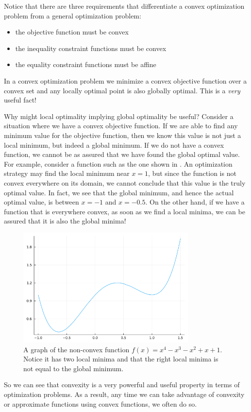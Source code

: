 Notice that there are three requirements that differentiate a convex optimization problem from a general optimization problem:
\begin{itemize}
	\item the objective function must be convex
	\item the inequality constraint functions must be convex
	\item the equality constraint functions must be affine
\end{itemize}

In a convex optimization problem we minimize a convex objective function over a convex set and any locally optimal point is also globally optimal. This is a \textit{very} useful fact!

Why might local optimality implying global optimality be useful? Consider a situation where we have a convex objective function. If we are able to find any minimum value for the objective function, then we know this value is not just a local minimum, but indeed a global minimum. If we do not have a convex function, we cannot be as assured that we have found the global optimal value. For example, consider a function such as the one shown in . An optimization strategy may find the local minimum near $x=1$, but since the function is not convex everywhere on its domain, we cannot conclude that this value is the truly optimal value. In fact, we see that the global minimum, and hence the actual optimal value, is between $x=-1$ and $x=-0.5$. On the other hand, if we have a function that is everywhere convex, as soon as we find a local minima, we can be assured that it is also the global minima!

\begin{figure}
	\centering
	\includegraphics[width=0.8\textwidth]{Chapter_I_Background/Images/Non-Convex-Example.png}
	\caption[A Non-Convex Function]{A graph of the non-convex function $f(x)=x^4-x^3-x^2+x+1$. Notice it has two local minima and that the right local minima is not equal to the global minimum.}
	\label{fig:non-convex-function-example}
\end{figure}

So we can see that convexity is a very powerful and useful property in terms of optimization problems. As a result, any time we can take advantage of convexity or approximate functions using convex functions, we often do so.